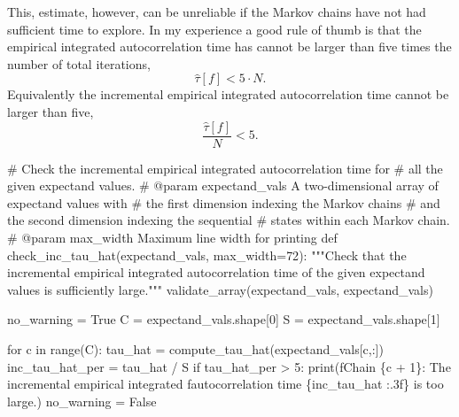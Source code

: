 \documentclass[
  letterpaper,
  DIV=11,
  numbers=noendperiod]{scrartcl}
\newenvironment{Shaded}{\begin{snugshade}}{\end{snugshade}}
\newcommand{\BuiltInTok}[1]{\textcolor[rgb]{0.00,0.23,0.31}{#1}}
\newcommand{\CommentTok}[1]{\textcolor[rgb]{0.37,0.37,0.37}{#1}}
\newcommand{\ControlFlowTok}[1]{\textcolor[rgb]{0.00,0.23,0.31}{#1}}
\newcommand{\DecValTok}[1]{\textcolor[rgb]{0.68,0.00,0.00}{#1}}
\newcommand{\KeywordTok}[1]{\textcolor[rgb]{0.00,0.23,0.31}{#1}}
\newcommand{\NormalTok}[1]{\textcolor[rgb]{0.00,0.23,0.31}{#1}}
\newcommand{\OperatorTok}[1]{\textcolor[rgb]{0.37,0.37,0.37}{#1}}
\newcommand{\SpecialCharTok}[1]{\textcolor[rgb]{0.37,0.37,0.37}{#1}}
\newcommand{\SpecialStringTok}[1]{\textcolor[rgb]{0.13,0.47,0.30}{#1}}
\newcommand{\StringTok}[1]{\textcolor[rgb]{0.13,0.47,0.30}{#1}}
\newcommand{\VariableTok}[1]{\textcolor[rgb]{0.07,0.07,0.07}{#1}}
\begin{document}
This, estimate, however, can be unreliable if the Markov chains have not
had sufficient time to explore. In my experience a good rule of thumb is
that the empirical integrated autocorrelation time has cannot be larger
than five times the number of total iterations, \[
\hat{\tau}[f] < 5 \cdot N.
\] Equivalently the incremental empirical integrated autocorrelation
time cannot be larger than five, \[
\frac{ \hat{\tau}[f] }{N} < 5.
\]

\begin{Shaded}
\begin{Highlighting}[]
\CommentTok{\# Check the incremental empirical integrated autocorrelation time for}
\CommentTok{\# all the given expectand values.}
\CommentTok{\# @param expectand\_vals A two{-}dimensional array of expectand values with}
\CommentTok{\#                       the first dimension indexing the Markov chains}
\CommentTok{\#                       and the second dimension indexing the sequential}
\CommentTok{\#                       states within each Markov chain.}
\CommentTok{\# @param max\_width Maximum line width for printing}
\KeywordTok{def}\NormalTok{ check\_inc\_tau\_hat(expectand\_vals, max\_width}\OperatorTok{=}\DecValTok{72}\NormalTok{):}
  \CommentTok{"""Check that the incremental empirical integrated autocorrelation}
\CommentTok{     time of the given expectand values is sufficiently large."""}
\NormalTok{  validate\_array(expectand\_vals, }\StringTok{\textquotesingle{}expectand\_vals\textquotesingle{}}\NormalTok{)}

\NormalTok{  no\_warning }\OperatorTok{=} \VariableTok{True}
\NormalTok{  C }\OperatorTok{=}\NormalTok{ expectand\_vals.shape[}\DecValTok{0}\NormalTok{]}
\NormalTok{  S }\OperatorTok{=}\NormalTok{ expectand\_vals.shape[}\DecValTok{1}\NormalTok{]}

  \ControlFlowTok{for}\NormalTok{ c }\KeywordTok{in} \BuiltInTok{range}\NormalTok{(C):}
\NormalTok{    tau\_hat }\OperatorTok{=}\NormalTok{ compute\_tau\_hat(expectand\_vals[c,:])}
\NormalTok{    inc\_tau\_hat\_per }\OperatorTok{=}\NormalTok{ tau\_hat }\OperatorTok{/}\NormalTok{ S}
    \ControlFlowTok{if}\NormalTok{ tau\_hat\_per }\OperatorTok{\textgreater{}} \DecValTok{5}\NormalTok{:}
      \BuiltInTok{print}\NormalTok{(}\SpecialStringTok{f\textquotesingle{}Chain }\SpecialCharTok{\{}\NormalTok{c }\OperatorTok{+} \DecValTok{1}\SpecialCharTok{\}}\SpecialStringTok{: The incremental empirical integrated \textquotesingle{}}
            \SpecialStringTok{f\textquotesingle{}autocorrelation time }\SpecialCharTok{\{}\NormalTok{inc\_tau\_hat }\SpecialCharTok{:.3f\}}\SpecialStringTok{ is too large.\textquotesingle{}}\NormalTok{)}
\NormalTok{      no\_warning }\OperatorTok{=} \VariableTok{False}


\end{Highlighting}
\end{Shaded}
\end{document}
